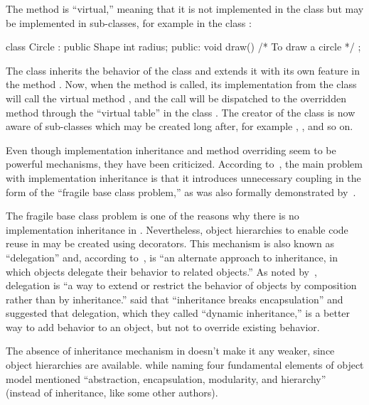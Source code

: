 The method  is ``virtual,'' meaning that it is not implemented in the class
 but may be implemented in sub-classes, for example in
the class :

\begin{ffcode}
class Circle : public Shape {
  int radius;
public:
  void draw() { /* To draw a circle */ }
};
\end{ffcode}

The class  inherits the behavior of the class  and
extends it with its own feature in the method . Now, when the
method  is called, its implementation from the class 
will call the virtual method , and the call will be dispatched
to the overridden method  through the ``virtual table'' in the class .
The creator of the class  is now aware of sub-classes
which may be created long after, for example , , and so on.

Even though implementation inheritance and method overriding seem to
be powerful mechanisms, they have been criticized.
According to~\citet{holub2003extends}, the main problem with
implementation inheritance is that it introduces unnecessary coupling
in the form of the ``fragile base class problem,''
as was also formally demonstrated by~\citet{mikhajlov1998study}.

The fragile base class problem is one of the reasons why
there is no implementation inheritance in \phic{}.
Nevertheless, object hierarchies to enable code reuse
in \phic{} may be created using decorators.
This mechanism is also known as ``delegation'' and, according
to~\citet[p.98]{grady2007object}, is ``an alternate approach to inheritance, in which
objects delegate their behavior to related objects.''
As noted by~\citet[p.139]{west2004object}, delegation is ``a way to extend or restrict
the behavior of objects by composition rather than by inheritance.''
\citet{seiter1998evolution} said that ``inheritance breaks encapsulation'' and suggested that
delegation, which they called ``dynamic inheritance,'' is a better way
to add behavior to an object, but not to override existing behavior.

The absence of inheritance mechanism in \phic{} doesn't make it
any weaker, since object hierarchies are available. \citet{grady2007object}
while naming four fundamental elements of object model mentioned
``abstraction, encapsulation, modularity, and hierarchy'' (instead of inheritance, like
some other authors).

